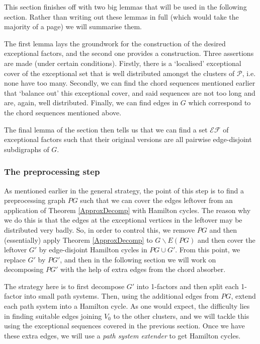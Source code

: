 \documentclass[10pt,letterpaper, reqno]{amsart}
\theoremstyle{definition}
\numberwithin{equation}{section}
\begin{document}
This section finishes off with two big lemmas that will be used in the following section. Rather than writing out these lemmas in full (which would take the majority of a page) we will summarise them. 

The first lemma lays the groundwork for the construction of the desired exceptional factors, and the second one provides a construction. Three assertions are made (under certain conditions). Firstly, there is a `localised' exceptional cover of the exceptional set that is well distributed amongst the clusters of $\mathcal{P}$, i.e. none have too many. Secondly, we can find the chord sequences mentioned earlier that `balance out' this exceptional cover, and said sequences are not too long and are, again, well distributed. Finally, we can find edges in $G$ which correspond to the chord sequences mentioned above. 

The final lemma of the section then tells us that we can find a set $\mathcal{EF}$ of exceptional factors such that their original versions are all pairwise edge-disjoint subdigraphs of $G$.
\subsubsection{The preprocessing step}As mentioned earlier in the general strategy, the point of this step is to find a preprocessing graph $PG$ such that we can cover the edges leftover from an application of Theorem \ref{ApproxDecomp} with Hamilton cycles. The reason why we do this is that the edges at the exceptional vertices in the leftover may be distributed very badly. So, in order to control this, we remove $PG$ and then (essentially) apply Theorem \ref{ApproxDecomp} to $G\backslash E(PG)$ and then cover the leftover $G'$ by edge-disjoint Hamilton cycles in $PG \cup G'$. From this point, we replace $G'$ by $PG'$, and then in the following section we will work on decomposing $PG'$ with the help of extra edges from the chord absorber. 

The strategy here is to first decompose $G'$ into 1-factors and then split each 1-factor into small path systems. Then, using the additional edges from $PG$, extend each path system into a Hamilton cycle. As one would expect, the difficulty lies in finding suitable edges joining $V_0$ to the other clusters, and we will tackle this using the exceptional sequences covered in the previous section. Once we have these extra edges, we will use a \textit{path system extender} to get Hamilton cycles. 
\end{document}
